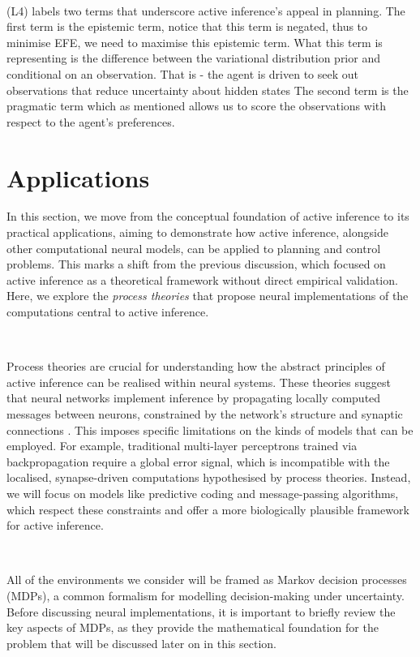 \documentclass{article}
\begin{document}
\

(L4) labels two terms that underscore active inference's appeal in planning. The first term is the epistemic term, notice that this term is negated, thus to minimise EFE, we need to maximise this epistemic term. What this term is representing is the difference between the variational distribution prior and conditional on an observation. That is - the agent is driven to seek out observations that reduce uncertainty about hidden states \citep{smith2022} The second term is the pragmatic term which as mentioned allows us to score the observations with respect to the agent's preferences. 

\section{Applications} 

In this section, we move from the conceptual foundation of active inference to its practical applications, aiming to demonstrate how active inference, alongside other computational neural models, can be applied to planning and control problems. This marks a shift from the previous discussion, which focused on active inference as a theoretical framework without direct empirical validation. Here, we explore the \textit{process theories} that propose neural implementations of the computations central to active inference.

\

Process theories are crucial for understanding how the abstract principles of active inference can be realised within neural systems. These theories suggest that neural networks implement inference by propagating locally computed messages between neurons, constrained by the network's structure and synaptic connections \citep{parr2019neuronal}. This imposes specific limitations on the kinds of models that can be employed. For example, traditional multi-layer perceptrons trained via backpropagation require a global error signal, which is incompatible with the localised, synapse-driven computations hypothesised by process theories. Instead, we will focus on models like predictive coding and message-passing algorithms, which respect these constraints and offer a more biologically plausible framework for active inference.

\

All of the environments we consider will be framed as Markov decision processes (MDPs), a common formalism for modelling decision-making under uncertainty. Before discussing neural implementations, it is important to briefly review the key aspects of MDPs, as they provide the mathematical foundation for the problem that will be discussed later on in this section.
\end{document}

